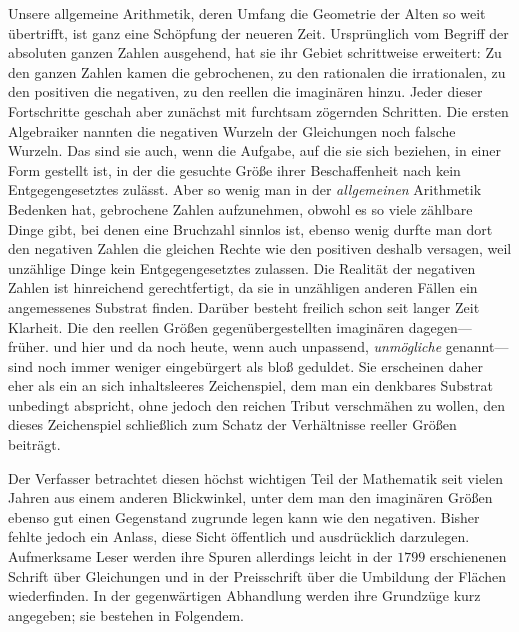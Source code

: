 Unsere allgemeine Arithmetik, deren Umfang die Geometrie der Alten so weit übertrifft, ist ganz eine Schöpfung der neueren Zeit. Ursprünglich vom Begriff der absoluten ganzen Zahlen ausgehend, hat sie ihr Gebiet schrittweise erweitert: Zu den ganzen Zahlen kamen die gebrochenen, zu den rationalen die irrationalen, zu den positiven die negativen, zu den reellen die imaginären hinzu. Jeder dieser Fortschritte geschah aber zunächst mit furchtsam zögernden Schritten. Die ersten Algebraiker nannten die negativen Wurzeln der Gleichungen noch falsche Wurzeln. Das sind sie auch, wenn die Aufgabe, auf die sie sich beziehen, in einer Form gestellt ist, in der die gesuchte Größe ihrer Beschaffenheit nach kein Entgegengesetztes zulässt. Aber so wenig man in der \emph{allgemeinen} Arithmetik Bedenken hat, gebrochene Zahlen aufzunehmen, obwohl es so viele zählbare Dinge gibt, bei denen eine Bruchzahl sinnlos ist, ebenso wenig durfte man dort den negativen Zahlen die gleichen Rechte wie den positiven deshalb versagen, weil unzählige Dinge kein Entgegengesetztes zulassen. Die Realität der negativen Zahlen ist hinreichend gerechtfertigt, da sie in unzähligen anderen Fällen ein angemessenes Substrat finden. Darüber besteht freilich schon seit langer Zeit Klarheit. Die den reellen Größen gegenübergestellten imaginären dagegen---früher. und hier und da noch heute, wenn auch unpassend, \emph{unmögliche} genannt---sind noch immer weniger eingebürgert als bloß geduldet. Sie erscheinen daher eher als ein an sich inhaltsleeres Zeichenspiel, dem man ein denkbares Substrat unbedingt abspricht, ohne jedoch den reichen Tribut verschmähen zu wollen, den dieses Zeichenspiel schließlich zum Schatz der Verhältnisse reeller Größen beiträgt.

Der Verfasser betrachtet diesen höchst wichtigen Teil der Mathematik seit vielen Jahren aus einem anderen Blickwinkel, unter dem man den imaginären Größen ebenso gut einen Gegenstand zugrunde legen kann wie den negativen. Bisher fehlte jedoch ein Anlass, diese Sicht öffentlich und ausdrücklich darzulegen. Aufmerksame Leser werden ihre Spuren allerdings leicht in der $1799$ erschienenen Schrift über Gleichungen und in der Preisschrift über die Umbildung der Flächen wiederfinden. In der gegenwärtigen Abhandlung werden ihre Grundzüge kurz angegeben; sie bestehen in Folgendem.


